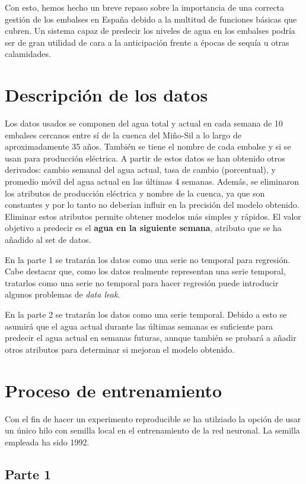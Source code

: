 \documentclass[12pt]{report} %
\begin{document}
Con esto, hemos hecho un breve repaso sobre la importancia de una correcta gestión de los embalses en España debido a la multitud de funciones básicas que cubren. Un sistema capaz de predecir los niveles de agua en los embalses podría ser de gran utilidad de cara a la anticipación frente a épocas de sequía u otras calamidades.

\chapter{Descripción de los datos}
\label{chap:datos}

    Los datos usados se componen del agua total y actual en cada semana de 10
    embalses cercanos entre sí de la cuenca del Miño-Sil a lo largo de aproximadamente
    35 años. También se tiene el nombre de cada embalse y si se usan para producción
    eléctrica. A partir de estos datos se han obtenido otros derivados:
    cambio semanal del agua actual, tasa de cambio (porcentual), y promedio móvil
    del agua actual en las últimas 4 semanas. Además, se eliminaron los
    atributos de producción eléctrica y nombre de la cuenca, ya que son constantes
    y por lo tanto no deberían influir en la precisión del modelo obtenido.
    Eliminar estos atributos permite obtener modelos más simples y
    rápidos. El valor objetivo a predecir es el \textbf{agua en la
    siguiente semana}, atributo que se ha añadido al set de datos.

    En la parte 1 se tratarán los datos como una serie no temporal para regresión.
    Cabe destacar que, como los datos realmente representan una serie temporal,
    tratarlos como una serie no temporal para hacer regresión puede introducir
    algunos problemas de \textit{data leak}.

    En la parte 2 se tratarán los datos como una serie temporal. Debido a esto
    se asumirá que el agua actual durante las últimas semanas es suficiente para
    predecir el agua actual en semanas futuras, aunque también se probará a añadir
    otros atributos para determinar si mejoran el modelo obtenido.

\chapter{Proceso de entrenamiento}
\label{chap:train}
    Con el fin de hacer un experimento reproducible se ha utilziado la opción de usar un único hilo con semilla local en el entrenamiento de la red neuronal. La semilla empleada ha sido 1992.
	\section{Parte 1}
\end{document}
